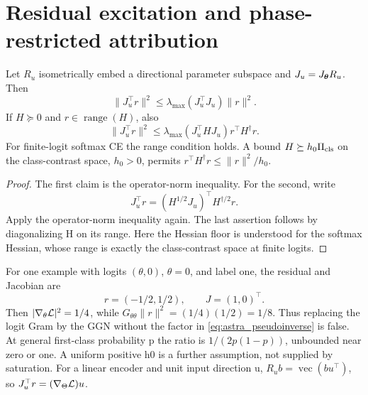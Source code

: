 \section{Residual excitation and phase-restricted attribution}
\label{sec:astra_excitation}
\begin{lemma}
\label{lem:astra_direction_gain}
Let $R_u$ isometrically embed a directional parameter subspace and
$J_u=J_{\boldsymbol{\theta}} R_u$. Then
\[
 \|J_u^\top r\|^2\le\lambda_{\max}(J_u^\top J_u)\|r\|^2.
\]
If $H\succeq0$ and $r\in\operatorname{range}(H)$, also
\begin{equation}\label{eq:astra_pseudoinverse}
 \|J_u^\top r\|^2\le\lambda_{\max}(J_u^\top HJ_u)r^\top H^\dagger r.
\end{equation}
For finite-logit softmax CE the range condition holds. A bound
$H\succeq h_0\Pi_{\rm cls}$ on the class-contrast space, $h_0>0$,
permits $r^\top H^\dagger r\le\|r\|^2/h_0$.
\end{lemma}
\begin{proof}
The first claim is the operator-norm inequality. For the second, write
\[J_u^\top r=(H^{1/2}J_u)^\top H^{\dagger/2}r.\]
Apply the operator-norm inequality again.
The last assertion follows by diagonalizing H on its range.
Here the Hessian floor is understood for the softmax Hessian, whose
range is exactly the class-contrast space at finite logits.
\end{proof}
\begin{remark}
For one example with logits $(\theta,0)$, $\theta=0$, and label one, the residual and Jacobian are
\[r=(-1/2,1/2),\qquad J=(1,0)^\top.\]
Then
$|\nabla_\theta\mathcal{L}|^2=1/4$, while
$G_{\theta\theta}\|r\|^2=(1/4)(1/2)=1/8$.
Thus replacing the logit Gram by the GGN without the factor in
\eqref{eq:astra_pseudoinverse} is false. At general first-class probability
p the ratio is $1/(2p(1-p))$, unbounded near zero or one.
A uniform positive h0 is a further assumption, not supplied by
saturation. For a linear encoder and unit input direction u,
$R_u b=\operatorname{vec}(bu^\top)$, so $J_u^\top r=(\nabla_\Theta\mathcal{L})u$.
\end{remark}

